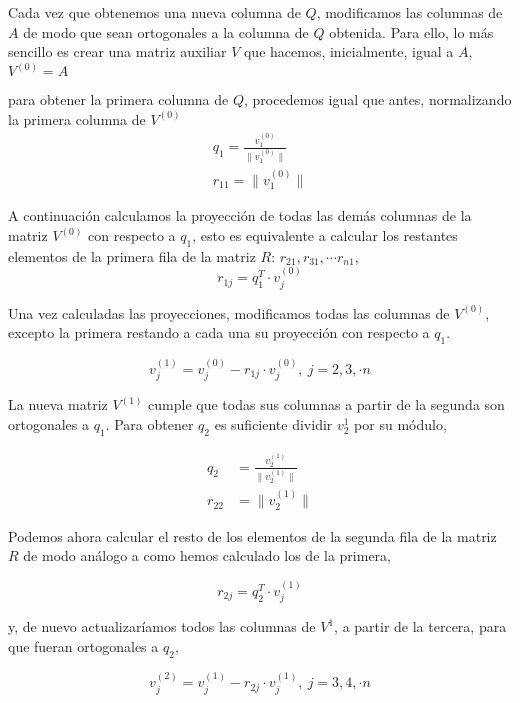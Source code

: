 Cada vez que obtenemos una nueva columna de $Q$, modificamos las columnas de $A$ de modo que sean ortogonales a la columna de $Q$ obtenida. Para ello, lo más sencillo es crear una matriz auxiliar $V$ que hacemos, inicialmente, igual a $A$, $V^{(0)}=A$

para obtener la primera columna de $Q$, procedemos igual que antes, normalizando la primera columna de $V^{(0)}$
\begin{align*}
q_1=\frac{v_1^{(0)}}{\lVert v_1^{(0)}\rVert}\\
r_{11}=\lVert v_1^{(0)}\rVert
\end{align*}

A continuación calculamos la proyección de todas las demás columnas de la matriz $V^{(0)}$ con respecto a $q_1$, esto es equivalente a calcular los restantes elementos de la primera fila de la matriz $R$: $r_{21}, r_{31}, \cdots r_{n1}$,
\begin{equation*}
r_{1j}=q_1^T\cdot v_j^{(0)}
\end{equation*}

Una vez calculadas las proyecciones, modificamos todas las columnas de $V^{(0)}$, excepto la primera restando a cada una su proyección con respecto a $q_1$.

\begin{equation*}
v_j^{(1)}=v_j^{(0)}-r_{1j}\cdot v_j^{(0)}, \ j=2,3,\cdot n
\end{equation*}

La nueva matriz $V^{(1)}$ cumple que todas sus columnas a partir de la segunda son ortogonales a $q_1$. Para obtener $q_2$ es suficiente dividir $v_2^{1}$ por su módulo,

\begin{align*}
q_2&=\frac{v_2^{(1)}}{\lVert v_2^{(1)} \rVert}\\
r_{22}&=\lVert v_2^{(1)} \rVert
\end{align*}

Podemos ahora calcular el resto de los elementos de la segunda fila de la matriz $R$ de modo análogo a como hemos calculado los de la primera,

\begin{equation*}
r_{2j}=q_2^T\cdot v_j^{(1)}
\end{equation*}

y, de nuevo actualizaríamos todos las columnas de $V^{1}$, a partir de la tercera, para que fueran ortogonales a $q_2$, 

\begin{equation*}
v_j^{(2)}=v_j^{(1)}-r_{2j}\cdot v_j^{(1)}, \ j=3,4,\cdot n
\end{equation*}


